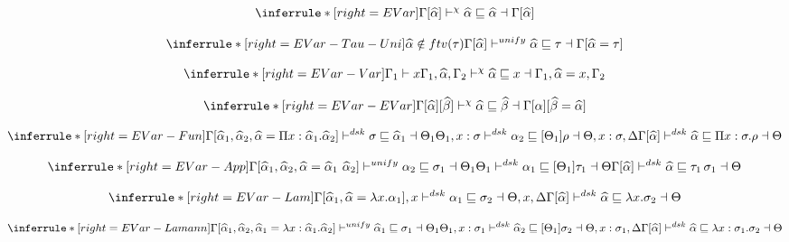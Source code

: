 \[
\inferrule*[right=EVar]
{ }
{\Gamma[\widehat \alpha ] \dskunify \widehat \alpha \sqsubseteq \widehat \alpha \dashv \Gamma[\widehat \alpha] }
\]


\framebox{$\Gamma[\alpha] \dskunify \widehat \alpha \sqsubseteq \rho$}

\[
\inferrule*[right=EVar-Tau-Uni]
{ \widehat \alpha \notin ftv(\tau)} %
{\Gamma[\widehat \alpha ] \unify \widehat \alpha \sqsubseteq \tau \dashv \Gamma[\widehat \alpha=\tau]}
\]

\[
\inferrule*[right=EVar-Var]
{\Gamma_1 \vdash x}
{\Gamma_1, \widehat \alpha, \Gamma_2 \dskunify \widehat \alpha \sqsubseteq x \dashv \Gamma_1, \widehat \alpha=x, \Gamma_2 }
\]

\[
\inferrule*[right=EVar-EVar]
{ }
{\Gamma[\widehat \alpha][\widehat \beta] \dskunify \widehat \alpha \sqsubseteq \widehat \beta \dashv
\Gamma[\alpha][\widehat \beta = \widehat \alpha] }
\]

\[
\inferrule*[right=EVar-Fun]
{\Gamma[\widehat \alpha_1, \widehat \alpha_2, \widehat \alpha = \Pi x: \widehat \alpha_1. \widehat \alpha_2]
    \polymorphic  \sigma \sqsubseteq \widehat \alpha_1 \dashv \Theta_1 \\
\Theta_1, x: \sigma \polymorphicstar \alpha_2 \sqsubseteq [\Theta_1] \rho \dashv \Theta, x:\sigma, \Delta}
{\Gamma[\widehat \alpha] \polymorphicstar \widehat \alpha \sqsubseteq \Pi x:\sigma. \rho \dashv \Theta}
\]

\[
\inferrule*[right=EVar-App]
{
\Gamma[\widehat \alpha_1, \widehat \alpha_2, \widehat \alpha = \widehat \alpha_1~\widehat \alpha_2]
    \unify \alpha_2 \sqsubseteq \sigma_1 \dashv \Theta_1 \\
\Theta_1 \polymorphicstar \alpha_1 \sqsubseteq [\Theta_1]\tau_1 \dashv \Theta
}
{\Gamma[\widehat \alpha]\polymorphicstar \widehat \alpha \sqsubseteq \tau_1\, \sigma_1 \dashv \Theta}
\]

\[
\inferrule*[right=EVar-Lam]
{
\Gamma[\widehat \alpha_1, \widehat \alpha = \lambda x. \alpha_1], x \polymorphic \alpha_1 \sqsubseteq \sigma_2 \dashv \Theta, x, \Delta}
{\Gamma[\widehat \alpha] \polymorphicstar \widehat \alpha \sqsubseteq \lambda x. \sigma_2 \dashv \Theta }
\]


\[
\inferrule*[right=EVar-Lamann]
{
\Gamma[\widehat \alpha_1, \widehat \alpha_2, \widehat \alpha_1 = \lambda x:\widehat \alpha_1. \widehat \alpha_2]
\unify \widehat \alpha_1 \sqsubseteq \sigma_1 \dashv \Theta_1 \\
\Theta_1, x:\sigma_1 \polymorphic \widehat \alpha_2 \sqsubseteq [\Theta_1]\sigma_2 \dashv \Theta, x:\sigma_1, \Delta }
{\Gamma[\widehat \alpha]\polymorphicstar \widehat \alpha \sqsubseteq \lambda x:\sigma_1. \sigma_2 \dashv \Theta
}
\]

